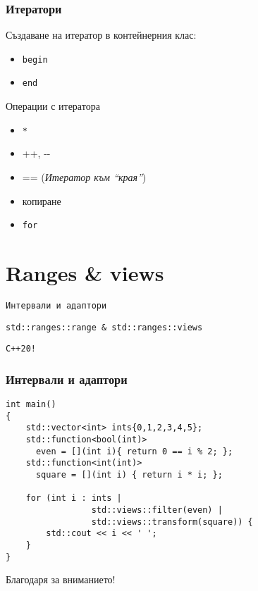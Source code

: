 \documentclass{beamer}
\begin{document}
\begin{frame}[fragile]
\frametitle{Итератори}

Създаване на итератор в контейнерния клас:
\begin{itemize}
  \item \texttt{begin}
  \item \texttt{end}
\end{itemize}
Операции с итератора
\begin{itemize}
  \item \texttt{*}
  \item ++, -{}-
  \item == (\emph{Итератор към ``края''})
  \item копиране
  \item \texttt{for}
\end{itemize}

\end{frame}

\section{Ranges \& views} 

\begin{frame}
  \centerline{\texttt{Интервали и адаптори}}
  \centerline{\texttt{std::ranges::range \& std::ranges::views}}
  \centerline{\texttt{C++20!}}
\end{frame}
  
\begin{frame}[fragile]
  \frametitle{Интервали и адаптори}
\begin{lstlisting}[basicstyle=\small]
int main()
{
    std::vector<int> ints{0,1,2,3,4,5};
    std::function<bool(int)> 
      even = [](int i){ return 0 == i % 2; };
    std::function<int(int)> 
      square = [](int i) { return i * i; };
  
    for (int i : ints | 
                 std::views::filter(even) | 
                 std::views::transform(square)) {
        std::cout << i << ' ';
    }
}  
\end{lstlisting}  
  
  \end{frame}
  

\begin{frame}
\centerline{Благодаря за вниманието!}
\end{frame}
\end{document}
